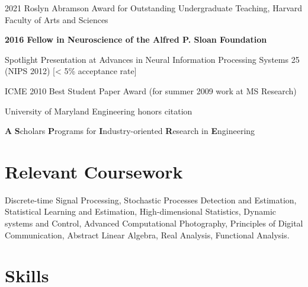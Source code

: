 \documentclass[12pt,letterpaper]{article}
\def\HCode#1{}
\renewenvironment{itemize}{
  \begin{list}{}{
    \setlength{\leftmargin}{1.5em}
    \setlength{\itemsep}{0.25em}
    \setlength{\parskip}{0pt}
    \setlength{\parsep}{0.25em}
  }
}{
  \end{list}
}
\begin{document}
\begin{itemize}
	\item 2021 Roslyn Abramson Award for Outstanding Undergraduate Teaching, Harvard Faculty of Arts and Sciences
	\item \textbf{2016 Fellow in Neuroscience of the Alfred P. Sloan Foundation}
    \item Spotlight Presentation at Advances in Neural Information Processing Systems 25 (NIPS 2012) [< 5\% acceptance rate]
    \item ICME 2010 Best Student Paper Award (for summer 2009 work at MS Research)
    \item University of Maryland Engineering honors citation
    \item \textbf{A} \textbf{S}cholars \textbf{P}rograms for \textbf{I}ndustry-oriented \textbf{R}esearch in \textbf{E}ngineering
\end{itemize}

\section*{Relevant Coursework}

Discrete-time Signal Processing, Stochastic Processes
Detection and Estimation, Statistical Learning and Estimation, High-dimensional Statistics,
Dynamic systems and Control, Advanced Computational Photography, Principles
of Digital Communication, Abstract Linear Algebra, Real Analysis, Functional
Analysis.



\HCode{<a name="journalpapers"></a>}
%






%
%
%

\section*{Skills}
\end{document}
